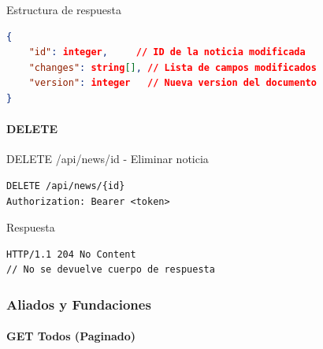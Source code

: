 \documentclass[11pt,a4paper]{article}
\begin{document}
\begin{center}
	\begin{minipage}{\textwidth}
		\begin{codebox}{Estructura de respuesta}
			\begin{lstlisting}[language=json]
{
    "id": integer,     // ID de la noticia modificada
    "changes": string[], // Lista de campos modificados
    "version": integer   // Nueva version del documento
}
\end{lstlisting}
		\end{codebox}
	\end{minipage}
\end{center}

\paragraph{DELETE}
\begin{center}
	\begin{minipage}{\textwidth}
		\begin{codebox}{DELETE /api/news/{id} - Eliminar noticia}
			\begin{lstlisting}[language=HTTP]
DELETE /api/news/{id}
Authorization: Bearer <token>
\end{lstlisting}
		\end{codebox}
	\end{minipage}
\end{center}

\begin{center}
	\begin{minipage}{\textwidth}
		\begin{codebox}{Respuesta}
			\begin{lstlisting}[language=HTTP]
HTTP/1.1 204 No Content
// No se devuelve cuerpo de respuesta
\end{lstlisting}
		\end{codebox}
	\end{minipage}
\end{center}


\subsubsection{Aliados y Fundaciones}

\paragraph{GET Todos (Paginado)}
\end{document}
